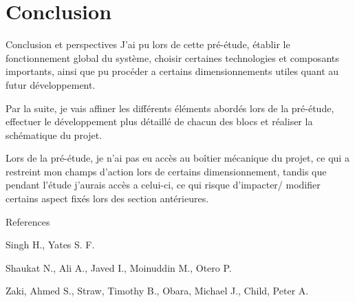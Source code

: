 \documentclass[compress,aspectratio=169]{beamer}
\begin{document}
\section{Conclusion}

\begin{frame}[containsverbatim]{Conclusion et perspectives}
	J’ai pu lors de cette pré-étude, établir le fonctionnement global du système,
	choisir certaines technologies et composants importants, ainsi que
	pu procéder a certains dimensionnements utiles quant au futur développement.
	
	
	Par la suite, je vais affiner les différents éléments abordés lors de la
	pré-étude, effectuer le développement plus détaillé de chacun des blocs et
	réaliser la schématique du projet.
	
	
	Lors de la pré-étude, je n’ai pas eu accès au boîtier mécanique du projet,
	ce qui a restreint mon champs d’action lors de certains dimensionnement,
	tandis que pendant l’étude j’aurais accès a celui-ci, ce qui risque d’impacter/
	modifier certains aspect fixés lors des section antérieures.
\end{frame}

\begin{frame}{References}
	\begin{thebibliography}{10}
    
    \beamertemplatearticlebibitems
    Singh H., Yates S. F.
    \newblock {}
    
	\beamertemplatearticlebibitems
	Shaukat N., Ali A., Javed I., Moinuddin M., Otero P.
	\newblock {}

	\beamertemplatearticlebibitems
	Zaki, Ahmed S., Straw, Timothy B., Obara, Michael J., Child, Peter A. 
	\newblock {}
	
  \end{thebibliography}
\end{frame}
\end{document}

